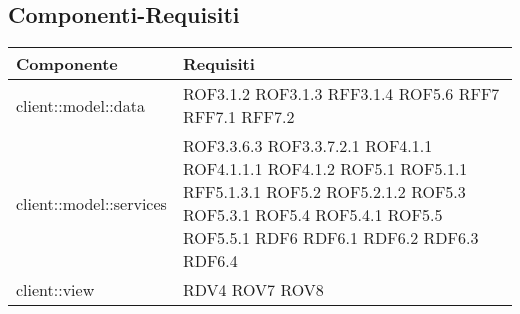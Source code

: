 \subsection{Componenti-Requisiti} %
\label{sub:componenti_requisiti}
\begin{center}
\def\arraystretch{1.5}
\bgroup
\begin{longtable}{| p{9cm} | p{4cm} |}
\hline
\textbf{Componente} & \textbf{Requisiti} \\
\hline
client::model::data  &  ROF3.1.2 \newline ROF3.1.3 \newline RFF3.1.4 \newline ROF5.6 \newline RFF7 \newline RFF7.1 \newline RFF7.2 \newline \\
\hline
client::model::services  & ROF3.3.6.3 \newline ROF3.3.7.2.1 \newline ROF4.1.1 \newline ROF4.1.1.1 \newline ROF4.1.2 \newline ROF5.1 \newline ROF5.1.1 \newline RFF5.1.3.1 \newline ROF5.2 \newline ROF5.2.1.2 \newline ROF5.3 \newline ROF5.3.1  \newline ROF5.4 \newline ROF5.4.1 \newline ROF5.5 \newline ROF5.5.1 \newline RDF6 \newline RDF6.1 \newline RDF6.2 \newline RDF6.3 \newline RDF6.4 \newline \\
\hline
client::view  & RDV4 \newline ROV7 \newline ROV8 \\
\hline

\end{longtable}
\end{center}
